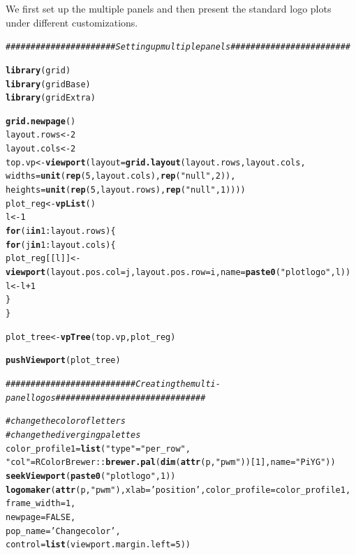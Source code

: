 \documentclass[12pt]{article}\usepackage[]{graphicx}\usepackage[usenames,dvipsnames]{color}
\makeatletter
\newcommand{\hlnum}[1]{\textcolor[rgb]{0.686,0.059,0.569}{#1}}%
\newcommand{\hlstr}[1]{\textcolor[rgb]{0.192,0.494,0.8}{#1}}%
\newcommand{\hlcom}[1]{\textcolor[rgb]{0.678,0.584,0.686}{\textit{#1}}}%
\newcommand{\hlopt}[1]{\textcolor[rgb]{0,0,0}{#1}}%
\newcommand{\hlstd}[1]{\textcolor[rgb]{0.345,0.345,0.345}{#1}}%
\newcommand{\hlkwa}[1]{\textcolor[rgb]{0.161,0.373,0.58}{\textbf{#1}}}%
\newcommand{\hlkwb}[1]{\textcolor[rgb]{0.69,0.353,0.396}{#1}}%
\newcommand{\hlkwc}[1]{\textcolor[rgb]{0.333,0.667,0.333}{#1}}%
\newcommand{\hlkwd}[1]{\textcolor[rgb]{0.737,0.353,0.396}{\textbf{#1}}}%
\newenvironment{kframe}{%
 \def\at@end@of@kframe{}%
 \ifinner\ifhmode%
  \def\at@end@of@kframe{\end{minipage}}%
  \begin{minipage}{\columnwidth}%
 \fi\fi%
 \def\FrameCommand##1{\hskip\@totalleftmargin \hskip-\fboxsep
 \colorbox{shadecolor}{##1}\hskip-\fboxsep
     \hskip-\linewidth \hskip-\@totalleftmargin \hskip\columnwidth}%
 \MakeFramed {\advance\hsize-\width
   \@totalleftmargin\z@ \linewidth\hsize
   \@setminipage}}%
 {\par\unskip\endMakeFramed%
 \at@end@of@kframe}
\newenvironment{knitrout}{}{} %
\makeatother
\begin{document}
We first set up the multiple panels and then present the standard logo plots under different customizations.

\begin{knitrout}
\color{fgcolor}\begin{kframe}
\begin{alltt}
\hlcom{######################      Setting up multiple panels        ########################}

\hlkwd{library}\hlstd{(grid)}
\hlkwd{library}\hlstd{(gridBase)}
\hlkwd{library}\hlstd{(gridExtra)}

\hlkwd{grid.newpage}\hlstd{()}
\hlstd{layout.rows} \hlkwb{<-} \hlnum{2}
\hlstd{layout.cols} \hlkwb{<-} \hlnum{2}
\hlstd{top.vp} \hlkwb{<-} \hlkwd{viewport}\hlstd{(}\hlkwc{layout}\hlstd{=}\hlkwd{grid.layout}\hlstd{(layout.rows, layout.cols,}
                                      \hlkwc{widths}\hlstd{=}\hlkwd{unit}\hlstd{(}\hlkwd{rep}\hlstd{(}\hlnum{5}\hlstd{,layout.cols),} \hlkwd{rep}\hlstd{(}\hlstr{"null"}\hlstd{,} \hlnum{2}\hlstd{)),}
                                      \hlkwc{heights}\hlstd{=}\hlkwd{unit}\hlstd{(}\hlkwd{rep}\hlstd{(}\hlnum{5}\hlstd{,layout.rows),} \hlkwd{rep}\hlstd{(}\hlstr{"null"}\hlstd{,} \hlnum{1}\hlstd{))))}
\hlstd{plot_reg} \hlkwb{<-} \hlkwd{vpList}\hlstd{()}
\hlstd{l} \hlkwb{<-} \hlnum{1}
\hlkwa{for}\hlstd{(i} \hlkwa{in} \hlnum{1}\hlopt{:}\hlstd{layout.rows)\{}
  \hlkwa{for}\hlstd{(j} \hlkwa{in} \hlnum{1}\hlopt{:}\hlstd{layout.cols)\{}
    \hlstd{plot_reg[[l]]} \hlkwb{<-} \hlkwd{viewport}\hlstd{(}\hlkwc{layout.pos.col} \hlstd{= j,} \hlkwc{layout.pos.row} \hlstd{= i,} \hlkwc{name} \hlstd{=} \hlkwd{paste0}\hlstd{(}\hlstr{"plotlogo"}\hlstd{, l))}
    \hlstd{l} \hlkwb{<-} \hlstd{l}\hlopt{+}\hlnum{1}
  \hlstd{\}}
\hlstd{\}}


\hlstd{plot_tree} \hlkwb{<-} \hlkwd{vpTree}\hlstd{(top.vp, plot_reg)}

\hlkwd{pushViewport}\hlstd{(plot_tree)}


\hlcom{##########################   Creating the multi-panel logos   ##############################}


\hlcom{#change the color of letters}
\hlcom{#change the diverging palettes}
\hlstd{color_profile1}\hlkwb{=}\hlkwd{list}\hlstd{(}\hlstr{"type"} \hlstd{=} \hlstr{"per_row"}\hlstd{,}
\hlstr{"col"} \hlstd{= RColorBrewer}\hlopt{::}\hlkwd{brewer.pal}\hlstd{(}\hlkwd{dim}\hlstd{(}\hlkwd{attr}\hlstd{(p,} \hlstr{"pwm"}\hlstd{))[}\hlnum{1}\hlstd{],}\hlkwc{name} \hlstd{=}\hlstr{"PiYG"}\hlstd{))}
\hlkwd{seekViewport}\hlstd{(}\hlkwd{paste0}\hlstd{(}\hlstr{"plotlogo"}\hlstd{,} \hlnum{1}\hlstd{))}
\hlkwd{logomaker}\hlstd{(}\hlkwd{attr}\hlstd{(p,} \hlstr{"pwm"}\hlstd{),}\hlkwc{xlab} \hlstd{=} \hlstr{'position'}\hlstd{,}\hlkwc{color_profile} \hlstd{= color_profile1,}
          \hlkwc{frame_width} \hlstd{=} \hlnum{1}\hlstd{,}
          \hlkwc{newpage} \hlstd{=} \hlnum{FALSE}\hlstd{,}
          \hlkwc{pop_name} \hlstd{=} \hlstr{'Change color'}\hlstd{,}
          \hlkwc{control} \hlstd{=} \hlkwd{list}\hlstd{(}\hlkwc{viewport.margin.left} \hlstd{=} \hlnum{5}\hlstd{))}


\end{alltt}
\end{kframe}
\end{knitrout}
\end{document}
